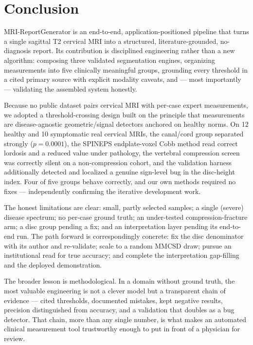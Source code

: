 \section{Conclusion}
\label{sec:conclusion}

MRI-ReportGenerator is an end-to-end, application-positioned pipeline that turns a single sagittal T2
cervical MRI into a structured, literature-grounded, no-diagnosis report. Its contribution is disciplined
engineering rather than a new algorithm: composing three validated segmentation engines, organizing
measurements into five clinically meaningful groups, grounding every threshold in a cited primary source
with explicit modality caveats, and --- most importantly --- validating the assembled system honestly.

Because no public dataset pairs cervical MRI with per-case expert measurements, we adopted a
threshold-crossing design built on the principle that measurements are disease-agnostic geometric/signal
detectors anchored on healthy norms. On 12 healthy and 10 symptomatic real cervical MRIs, the canal/cord
group separated strongly ($p=0.0001$), the SPINEPS endplate-voxel Cobb method read correct lordosis and a
reduced value under pathology, the vertebral compression screen was correctly silent on a non-compression
cohort, and the validation harness additionally detected and localized a genuine sign-level bug in the
disc-height index. Four of five groups behave correctly, and our own methods required no fixes ---
independently confirming the iterative development work.

The honest limitations are clear: small, partly selected samples; a single (severe) disease spectrum; no
per-case ground truth; an under-tested compression-fracture arm; a disc group pending a fix; and an
interpretation layer pending its end-to-end run. The path forward is correspondingly concrete: fix the
disc denominator with its author and re-validate; scale to a random MMCSD draw; pursue an institutional
read for true accuracy; and complete the interpretation gap-filling and the deployed demonstration.

The broader lesson is methodological. In a domain without ground truth, the most valuable engineering is
not a clever model but a transparent chain of evidence --- cited thresholds, documented mistakes, kept
negative results, precision distinguished from accuracy, and a validation that doubles as a bug detector.
That chain, more than any single number, is what makes an automated clinical measurement tool trustworthy
enough to put in front of a physician for review.
